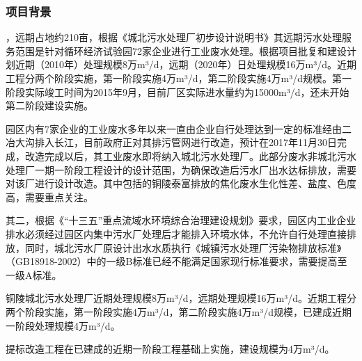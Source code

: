 \subsubsection{项目背景}
，远期占地约210亩，根据《城北污水处理厂初步设计说明书》其远期污水处理服务范围是针对循环经济试验园72家企业进行工业废水处理。根据项目批复和建设计划近期（2010年）处理规模8万m³/d，远期（2020年）日处理规模16万m³/d。近期工程分两个阶段实施，第一阶段实施4万m³/d，第二阶段实施4万m³/d规模。第一阶段实际竣工时间为2015年9月，目前厂区实际进水量约为15000m³/d，还未开始第二阶段建设实施。\par
园区内有7家企业的工业废水多年以来一直由企业自行处理达到一定的标准经由二冶大沟排入长江，目前政府正对其排污管网进行改造，预计在2017年11月30日完成，改造完成以后，其工业废水即将纳入城北污水处理厂。此部分废水非城北污水处理厂一期一阶段工程设计的设计范围，为确保改造后污水厂出水达标排放，需要对该厂进行设计改造。其中包括的铜陵泰富排放的焦化废水生化性差、盐度、色度高，需要重点关注。\par
其二，根据《“十三五”重点流域水环境综合治理建设规划》要求，园区内工业企业排水必须经过园区内集中污水厂处理后才能排入环境水体，不允许自行处理直接排放，同时，城北污水厂原设计出水水质执行《城镇污水处理厂污染物排放标准》（GB18918-2002）中的一级B标准已经不能满足国家现行标准要求，需要提高至一级A标准。\par
铜陵城北污水处理厂近期处理规模8万m³/d，远期处理规模16万m³/d。近期工程分两个阶段实施，第一阶段实施4万m³/d，第二阶段实施4万m³/d规模，已建成近期一阶段处理规模4万m³/d。\par
提标改造工程在已建成的近期一阶段工程基础上实施，建设规模为4万m³/d。\par
